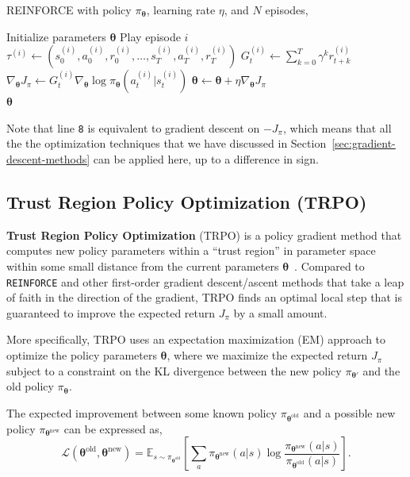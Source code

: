 \documentclass[12pt]{report}
\theoremstyle{definition}
\theoremstyle{remark}
\begin{document}
\begin{algorithm}
    \caption{\textsc{REINFORCE} with policy $\pi_{\boldsymbol{\theta}}$, learning rate $\eta$, and $N$ episodes, }\label{alg:REINFORCE}
    \begin{algorithmic}[1]
        \State Initialize parameters $\boldsymbol{\theta}$
            \State Play episode $i$
            \State $\tau^{(i)} \leftarrow (s_0^{(i)}, a_0^{(i)}, r_0^{(i)}, \ldots, s_T^{(i)}, a_T^{(i)}, r_T^{(i)})$
                \State $G_t^{(i)} \leftarrow \sum_{k=0}^{T} \gamma^k r_{t+k}^{(i)}$
                \State $\nabla_{\boldsymbol{\theta}} J_\pi \leftarrow G_t^{(i)} \nabla_{\boldsymbol{\theta}} \log \pi_{\boldsymbol{\theta}}(a_t^{(i)} | s_t^{(i)})$
                \State $\boldsymbol{\theta} \leftarrow \boldsymbol{\theta} + \eta \nabla_{\boldsymbol{\theta}} J_\pi$
            \EndFor
        \EndFor \\
        \Return $\boldsymbol{\theta}$
    \end{algorithmic}
\end{algorithm}
Note that line \texttt{8} is equivalent to gradient descent on $-J_\pi$, which means that all the the optimization techniques that we have discussed in Section~\ref{sec:gradient-descent-methods} can be applied here, up to a difference in sign.

\subsection{Trust Region Policy Optimization (TRPO)}
\textbf{Trust Region Policy Optimization} (TRPO) is a policy gradient method that computes new policy parameters within a ``trust region'' in parameter space within some small distance from the current parameters $\boldsymbol{\theta}$~\cite{schulman_trust_2015}. Compared to \texttt{REINFORCE} and other first-order gradient descent/ascent methods that take a leap of faith in the direction of the gradient, TRPO finds an optimal local step that is guaranteed to improve the expected return $J_\pi$ by a small amount.

More specifically, TRPO uses an expectation maximization (EM) approach to optimize the policy parameters $\boldsymbol{\theta}$, where we maximize the expected return $J_\pi$ subject to a constraint on the KL divergence between the new policy $\pi_{\boldsymbol{\theta}'}$ and the old policy $\pi_{\boldsymbol{\theta}}$.

The expected improvement between some known policy $\pi_{\boldsymbol{\theta}^{\text{old}}}$ and a possible new policy $\pi_{\boldsymbol{\theta}^{\text{new}}}$ can be expressed as,
\begin{equation}
    \mathcal{L}(\boldsymbol{\theta}^\text{old}, \boldsymbol{\theta}^\text{new})= \mathbb{E}_{s\sim\pi_{\boldsymbol{\theta}^\text{old}}}\left[\sum_a \pi_{\boldsymbol{\theta}^\text{new}}(a | s) \log \frac{\pi_{\boldsymbol{\theta}^\text{new}}(a|s)}{\pi_{\boldsymbol{\theta}^\text{old}}(a|s)}\right].
\end{equation}
\end{document}
